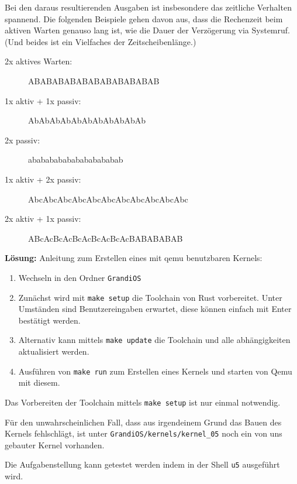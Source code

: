 \begin{description}
\begin{enumerate}
\end{enumerate}
Bei den daraus resultierenden Ausgaben ist insbesondere das zeitliche Verhalten spannend. 
Die folgenden Beispiele gehen davon aus, dass die Rechenzeit beim aktiven Warten genauso 
lang ist, wie die Dauer der Verzögerung via Systemruf. (Und beides ist ein Vielfaches der 
Zeitscheibenlänge.) 
\begin{description}
  \item[2x aktives Warten:] ABABABABABABABABABABAB 
  \item[1x aktiv + 1x passiv:] AbAbAbAbAbAbAbAbAbAbAb 
  \item[2x passiv:] ababababababababababab 
  \item[1x aktiv + 2x passiv:] AbcAbcAbcAbcAbcAbcAbcAbcAbcAbcAbc 
  \item[2x aktiv + 1x passiv:] ABcAcBcAcBcAcBcAcBcAcBABABABAB
\end{description}

\textbf{Lösung:}
Anleitung zum Erstellen eines mit qemu benutzbaren Kernels:
\begin{enumerate}
  \item Wechseln in den Ordner \texttt{GrandiOS}
  \item Zunächst wird mit \texttt{make setup} die Toolchain von Rust vorbereitet. Unter Umständen sind Benutzereingaben erwartet, diese können einfach mit Enter bestätigt werden.
  \item Alternativ kann mittels \texttt{make update} die Toolchain und alle abhängigkeiten aktualisiert werden.
  \item Ausführen von \texttt{make run} zum Erstellen eines Kernels und starten von Qemu mit diesem.
\end{enumerate}
Das Vorbereiten der Toolchain mittels \texttt{make setup} ist nur einmal notwendig.

Für den unwahrscheinlichen Fall, dass aus irgendeinem Grund das Bauen des Kernels fehlschlägt, ist unter {\texttt{GrandiOS/kernels/kernel\_05}} noch ein von uns gebauter Kernel vorhanden.

Die Aufgabenstellung kann getestet werden indem in der Shell \texttt{u5} ausgeführt wird.


\end{description}
